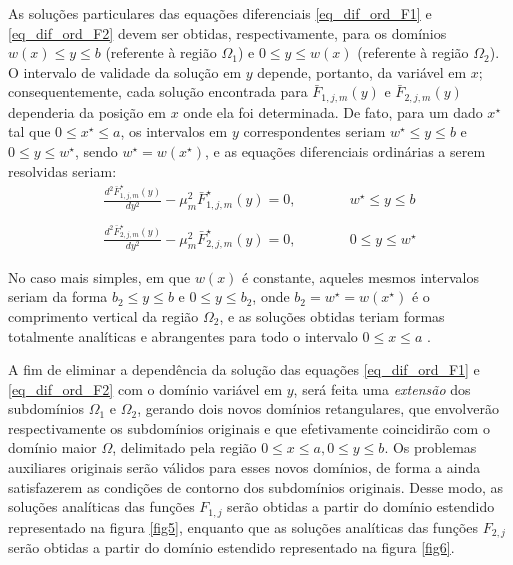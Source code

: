 As soluções particulares das equações diferenciais \eqref{eq_dif_ord_F1} e \eqref{eq_dif_ord_F2} devem ser obtidas, respectivamente, para os domínios $w(x) \le y \le b$ (referente à região $\Omega_1$) e $0 \le y \le w(x)$ (referente à região $\Omega_2$). O intervalo de validade da solução em $y$ depende, portanto, da variável em $x$; consequentemente, cada solução encontrada para $\bar{F}_{1,j,m}(y)$ e $\bar{F}_{2,j,m}(y)$ dependeria da posição em $x$ onde ela foi determinada. De fato, para um dado $x^\star$ tal que $0 \le x^\star \le a$, os intervalos em $y$ correspondentes seriam $w^\star \le y \le b$ e $0 \le y \le w^\star$, sendo $w^\star = w(x^\star)$, e as equações diferenciais ordinárias a serem resolvidas seriam:
\begin{align}
\frac{d^2 \bar{F}_{1,j,m}^\star(y)}{d y^2}
-
\mu_m^2 \bar{F}^\star_{1,j,m}(y) = 0, \quad\quad\quad& w^\star \le y \le b \label{eq_dif_ord_F1_particular}
\\ \nonumber \\
\frac{d^2 \bar{F}^\star_{2,j,m}(y)}{d y^2}
-
\mu_m^2 \bar{F}^\star_{2,j,m}(y) = 0, \quad\quad\quad& 0 \le y \le w^\star \label{eq_dif_ord_F2_particular}
\end{align}


No caso mais simples, em que $w(x)$ é constante, aqueles mesmos intervalos seriam da forma $b_2 \le y \le b$ e $0 \le y \le b_2$, onde $b_2 = w^\star = w(x^\star)$ é o comprimento vertical da região $\Omega_2$, e as soluções obtidas teriam formas totalmente analíticas e abrangentes para todo o intervalo $0 \le x \le a$ \citep{tese_padilha}.

A fim de eliminar a dependência da solução das equações \eqref{eq_dif_ord_F1} e \eqref{eq_dif_ord_F2} com o domínio variável em $y$, será feita uma \textit{extensão} dos subdomínios $\Omega_1$ e $\Omega_2$, gerando dois novos domínios retangulares,
que envolverão respectivamente os subdomínios originais e que efetivamente coincidirão com o domínio maior $\Omega$, delimitado pela região $0 \le x \le a, 0 \le y \le b$. Os problemas auxiliares originais serão válidos para esses novos domínios, de forma a ainda
satisfazerem as condições de contorno dos subdomínios originais.
Desse modo, as soluções analíticas das funções $F_{1, j}$ serão obtidas a partir do domínio estendido representado na figura \ref{fig5}, enquanto que
as soluções analíticas das funções $F_{2, j}$ serão obtidas a partir do domínio estendido representado na figura \ref{fig6}.

